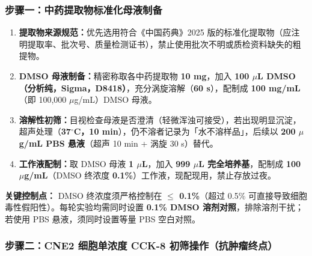 \documentclass[12pt,a4paper,twoside]{article}
\begin{document}
\subsubsection{步骤一：中药提取物标准化母液制备}

\begin{enumerate}
  \item \textbf{提取物来源规范：}优先选用符合《中国药典》2025 版的标准化提取物（应注明提取率、批次号、质量检测证书），禁止使用批次不明或质检资料缺失的粗提物。
  \item \textbf{DMSO 母液制备：}精密称取各中药提取物 \textbf{10 mg}，加入 \textbf{100 $\mu$L DMSO（分析纯，Sigma，D8418）}，充分涡旋溶解（\textbf{60 s}），配制成 \textbf{100 mg/mL}（即 100,000 $\mu$g/mL）DMSO 母液。
  \item \textbf{溶解性初筛：}目视检查母液是否澄清（轻微浑浊可接受），若出现明显沉淀，超声处理（\textbf{37$^{\circ}$C，10 min}），仍不溶者记录为「水不溶样品」，后续以 \textbf{200 $\mu$g/mL PBS 悬液}（超声 10 min + 涡旋 30 s）替代。
  \item \textbf{工作液配制：}取 DMSO 母液 \textbf{1 $\mu$L}，加入 \textbf{999 $\mu$L 完全培养基}，配制成 \textbf{100 $\mu$g/mL}（DMSO 终浓度 \textbf{0.1\%}）工作液，现配现用，禁止存放过夜。
\end{enumerate}

\begin{warningbox}
\textbf{关键控制点：} DMSO 终浓度须严格控制在 \textbf{$\leq$ 0.1\%}（超过 0.5\% 可直接导致细胞毒性假阳性）。每轮实验均需同时设置 \textbf{0.1\% DMSO 溶剂对照}，排除溶剂干扰；若使用 PBS 悬液，须同时设置等量 PBS 空白对照。
\end{warningbox}

\subsubsection{步骤二：CNE2 细胞单浓度 CCK-8 初筛操作（抗肿瘤终点）}
\end{document}
